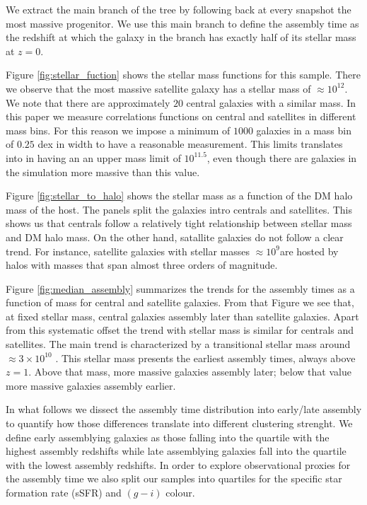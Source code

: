 \documentclass{aa}
\begin{document}
We extract the main branch of the tree by following back at every
snapshot the most massive progenitor.
We use this main branch to define the assembly time as the redshift
at which the galaxy in the branch has exactly half of its stellar mass
at $z=0$.   


Figure \ref{fig:stellar_fuction} shows the stellar mass functions for
this sample.
There we observe that the most massive satellite galaxy has a stellar
mass of $\approx 10^{12}$\Msunh.    
We note that there are approximately $20$ central galaxies
with a similar mass.
In this paper we measure correlations functions on central and
satellites in different mass bins.
For this reason we impose a  minimum of $1000$ galaxies
in a mass bin of $0.25$ dex in width to have a reasonable
measurement. 
This limits translates into in having an an upper mass limit of
$10^{11.5}$\Msunh, even though there are galaxies in the simulation
more massive than this value.

Figure \ref{fig:stellar_to_halo} shows the stellar mass as a function
of the DM halo mass of the host.
The panels split the galaxies intro centrals and satellites. 
This shows us that centrals follow a relatively tight relationship
between stellar mass and DM halo mass.
On the other hand, satallite galaxies do not follow a clear trend.
For instance, satellite galaxies with stellar masses $\approx
10^{9}$\Msunh are hosted by halos with masses that span almost three
orders of magnitude.

Figure \ref{fig:median_assembly} summarizes the trends for the
assembly times as a function of mass for central and satellite
galaxies.
From that Figure we see that, at fixed stellar mass, central galaxies
assembly later than  satellite galaxies.
Apart from this systematic offset the trend with stellar mass is
similar for centrals and satellites.
The main trend is characterized by a transitional stellar mass around 
$\approx 3\times 10^{10}$ \Msunh.
This stellar mass presents the earliest assembly times, always above $z=1$.
Above that mass, more massive galaxies assembly later; below that
value more massive galaxies assembly earlier.

In what follows we dissect the assembly time distribution into
early/late assembly to quantify how those differences translate into
different clustering strenght.
We define early assemblying galaxies as those falling into the
quartile with the highest assembly redshifts while late assemblying
galaxies fall into the quartile with the lowest assembly redshifts.
In order to explore observational proxies for the assembly time we
also split our samples into quartiles for the specific star formation
rate (sSFR) and $(g-i)$ colour. 
\end{document}
